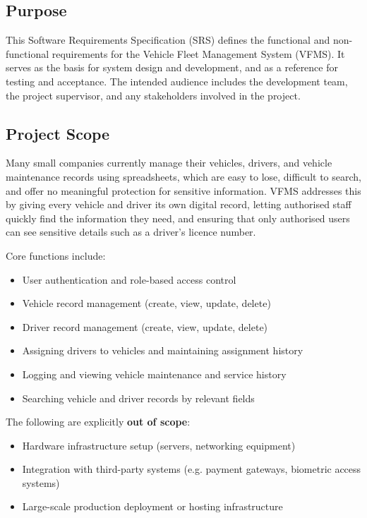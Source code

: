 \documentclass[11pt,a4paper]{article}
\begin{document}
\subsection{Purpose}
This Software Requirements Specification (SRS) defines the functional and
non-functional requirements for the Vehicle Fleet Management System (VFMS).
It serves as the basis for system design and development, and as a
reference for testing and acceptance. The intended audience includes the
development team, the project supervisor, and any stakeholders involved in
the project.

\subsection{Project Scope}
Many small companies currently manage their vehicles, drivers, and vehicle
maintenance records using spreadsheets, which are easy to lose, difficult
to search, and offer no meaningful protection for sensitive information.
VFMS addresses this by giving every vehicle and driver its own digital
record, letting authorised staff quickly find the information they need,
and ensuring that only authorised users can see sensitive details such as
a driver's licence number.

Core functions include:
\begin{itemize}
  \item User authentication and role-based access control
  \item Vehicle record management (create, view, update, delete)
  \item Driver record management (create, view, update, delete)
  \item Assigning drivers to vehicles and maintaining assignment history
  \item Logging and viewing vehicle maintenance and service history
  \item Searching vehicle and driver records by relevant fields
\end{itemize}

The following are explicitly \textbf{out of scope}:
\begin{itemize}
  \item Hardware infrastructure setup (servers, networking equipment)
  \item Integration with third-party systems (e.g. payment gateways,
  biometric access systems)
  \item Large-scale production deployment or hosting infrastructure
\end{itemize}
\end{document}
